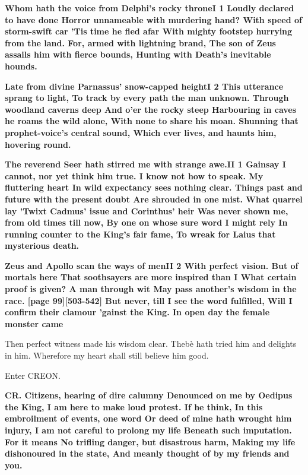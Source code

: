 \documentclass[11pt,letter]{book}
\begin{document}
\par \textbf{Whom hath the voice from Delphi’s rocky throneI 1 Loudly declared to have done Horror unnameable with murdering hand? With speed of storm-swift car ’Tis time he fled afar With mighty footstep hurrying from the land. For, armed with lightning brand, The son of Zeus assails him with fierce bounds, Hunting with Death’s inevitable hounds.}
\par 

\par \textbf{Late from divine Parnassus’ snow-capped heightI 2 This utterance sprang to light, To track by every path the man unknown. Through woodland caverns deep And o’er the rocky steep Harbouring in caves he roams the wild alone, With none to share his moan. Shunning that prophet-voice’s central sound, Which ever lives, and haunts him, hovering round.}
\par 

\par \textbf{The reverend Seer hath stirred me with strange awe.II 1 Gainsay I cannot, nor yet think him true. I know not how to speak. My fluttering heart In wild expectancy sees nothing clear. Things past and future with the present doubt Are shrouded in one mist. What quarrel lay ’Twixt Cadmus’ issue and Corinthus’ heir Was never shown me, from old times till now, By one on whose sure word I might rely In running counter to the King’s fair fame, To wreak for Laius that mysterious death.}
\par 

\par \textbf{Zeus and Apollo scan the ways of menII 2 With perfect vision. But of mortals here That soothsayers are more inspired than I What certain proof is given? A man through wit May pass another’s wisdom in the race. [page 99][503-542] But never, till I see the word fulfilled, Will I confirm their clamour ’gainst the King. In open day the female monster came}
\par   Then perfect witness made his wisdom clear. Thebè hath tried him and delights in him. Wherefore my heart shall still believe him good.

\par  Enter CREON.

\par \textbf{CR. Citizens, hearing of dire calumny Denounced on me by Oedipus the King, I am here to make loud protest. If he think, In this embroilment of events, one word Or deed of mine hath wrought him injury, I am not careful to prolong my life Beneath such imputation. For it means No trifling danger, but disastrous harm, Making my life dishonoured in the state, And meanly thought of by my friends and you.}
\par 
\end{document}
